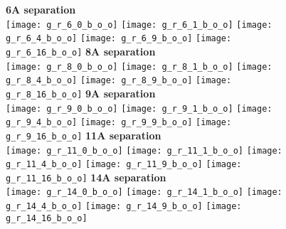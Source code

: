 \documentclass[journal=acsnano,manuscript=article]{achemso}
\begin{document}
\begin{figure}[h!]
	\centering
	\textbf{6A separation} \\
	\texttt{[image: g\_r\_6\_0\_b\_o\_o]} 
	\texttt{[image: g\_r\_6\_1\_b\_o\_o]}
	\texttt{[image: g\_r\_6\_4\_b\_o\_o]}
	\texttt{[image: g\_r\_6\_9\_b\_o\_o]}
	\texttt{[image: g\_r\_6\_16\_b\_o\_o]}
	\textbf{8A separation} \\
	\texttt{[image: g\_r\_8\_0\_b\_o\_o]} 
	\texttt{[image: g\_r\_8\_1\_b\_o\_o]}
	\texttt{[image: g\_r\_8\_4\_b\_o\_o]}
	\texttt{[image: g\_r\_8\_9\_b\_o\_o]}
	\texttt{[image: g\_r\_8\_16\_b\_o\_o]}
	\textbf{9A separation} \\
	\texttt{[image: g\_r\_9\_0\_b\_o\_o]} 
	\texttt{[image: g\_r\_9\_1\_b\_o\_o]}
	\texttt{[image: g\_r\_9\_4\_b\_o\_o]}
	\texttt{[image: g\_r\_9\_9\_b\_o\_o]}
	\texttt{[image: g\_r\_9\_16\_b\_o\_o]}
	\textbf{11A separation} \\
	\texttt{[image: g\_r\_11\_0\_b\_o\_o]} 
	\texttt{[image: g\_r\_11\_1\_b\_o\_o]}
	\texttt{[image: g\_r\_11\_4\_b\_o\_o]}
	\texttt{[image: g\_r\_11\_9\_b\_o\_o]}
	\texttt{[image: g\_r\_11\_16\_b\_o\_o]}
	\textbf{14A separation} \\
	\texttt{[image: g\_r\_14\_0\_b\_o\_o]} 
	\texttt{[image: g\_r\_14\_1\_b\_o\_o]}
	\texttt{[image: g\_r\_14\_4\_b\_o\_o]}
	\texttt{[image: g\_r\_14\_9\_b\_o\_o]}
	\texttt{[image: g\_r\_14\_16\_b\_o\_o]}
	\label{fig:gr}
\end{figure}
\end{document}
